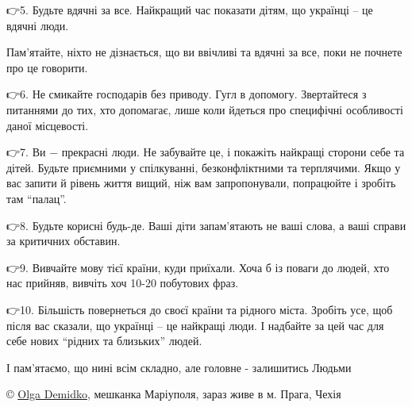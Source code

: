 👉5. Будьте вдячні за все. Найкращий час показати дітям, що українці – це
вдячні люди.

Пам'ятайте, ніхто не дізнається, що ви ввічливі та вдячні за все, поки не
почнете про це говорити.

👉6. Не смикайте господарів без приводу. Гугл в допомогу. Звертайтеся з
питаннями до тих, хто допомагає, лише коли йдеться про специфічні особливості
даної місцевості.

👉7. Ви − прекрасні люди. Не забувайте це, і покажіть найкращі сторони себе та
дітей. Будьте приємними у спілкуванні, безконфліктними та терплячими. Якщо у
вас запити й рівень життя вищий, ніж вам запропонували, попрацюйте і зробіть
там \enquote{палац}.

👉8. Будьте корисні будь-де. Ваші діти запам'ятають не ваші слова, а ваші
справи за критичних обставин.

👉9. Вивчайте мову тієї країни, куди приїхали. Хоча б із поваги до людей, хто
нас прийняв, вивчіть хоч 10-20 побутових фраз.

👉10. Більшість повернеться до своєї країни та рідного міста. Зробіть усе, щоб
після вас сказали, що українці – це найкращі люди. І надбайте за цей час для
себе нових \enquote{рідних та близьких} людей. 

І пам'ятаємо, що нині всім складно, але головне - залишитись Людьми🙏🇺🇦

© \href{\urlDemidkoIA}{Olga Demidko}, мешканка Маріуполя, зараз живе в м. Прага, Чехія

